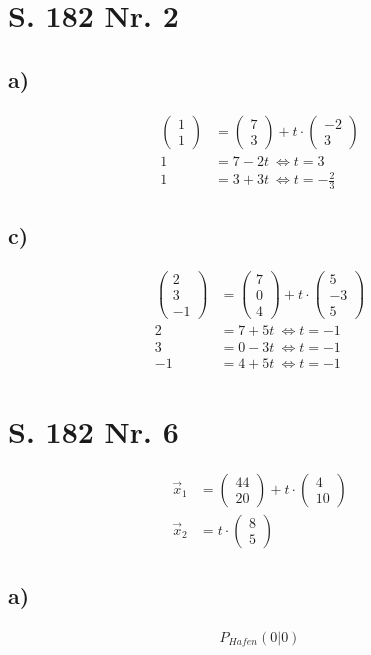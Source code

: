 \documentclass[12pt,a4paper]{report}
\begin{document}
	\section{S. 182 Nr. 2}
	\subsection{a)}
	\begin{align*}
		\begin{pmatrix}
			1 \\ 1
		\end{pmatrix} &= \begin{pmatrix}
			7 \\ 3
		\end{pmatrix} + t \cdot \begin{pmatrix}
			-2 \\ 3
		\end{pmatrix} \\
		1 &= 7 - 2t \ \Leftrightarrow t = 3 \\
		1 &= 3 + 3t\ \Leftrightarrow t = -\frac{2}{3}
	\end{align*}
	\subsection{c)}
	\begin{align*}
		\begin{pmatrix}
			2 \\ 3 \\ -1
		\end{pmatrix} &= \begin{pmatrix}
			7 \\ 0 \\ 4
		\end{pmatrix} + t \cdot \begin{pmatrix}
			5 \\ -3 \\ 5
		\end{pmatrix} \\
		2 &= 7 + 5t\ \Leftrightarrow t = -1 \\
		3 &= 0-3t\ \Leftrightarrow t = -1 \\
		-1 &= 4 + 5t\ \Leftrightarrow t = -1
	\end{align*}
	\section{S. 182 Nr. 6}
	\begin{align*}
		\overrightarrow x_1 &= \begin{pmatrix}
			44 \\ 20
		\end{pmatrix}
		+ t \cdot \begin{pmatrix}
			4 \\ 10
		\end{pmatrix} \\
		\overrightarrow x_ 2 &= t \cdot \begin{pmatrix}
			8 \\ 5
		\end{pmatrix}
	\end{align*}
	\subsection{a)}
	\begin{align*}
		P_{Hafen}(0|0)
	\end{align*}
\end{document}
